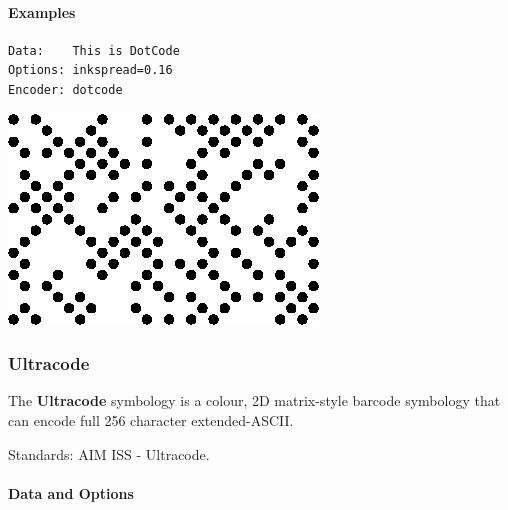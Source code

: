 \hypertarget{examples-43}{%
\paragraph{Examples}\label{examples-43}}

\begin{verbatim}
Data:    This is DotCode
Options: inkspread=0.16
Encoder: dotcode
\end{verbatim}

\includegraphics{images/dotcode-1.eps}

\hypertarget{ultracode}{%
\subsubsection{Ultracode}\label{ultracode}}

The \textbf{Ultracode} symbology is a colour, 2D matrix-style barcode
symbology that can encode full 256 character extended-ASCII.

Standards: AIM ISS - Ultracode.

\hypertarget{data-and-options-67}{%
\paragraph{Data and Options}\label{data-and-options-67}}

